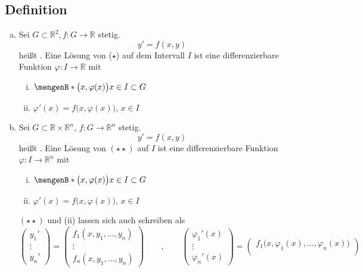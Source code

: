 \subsection[Definition: Gewöhnliche Differentialgleichungen]{Definition} %
\label{sub:11}
\begin{enumerate}[a)]
	\item Sei $G \subset \mathds{R}^2, f : G \to \mathds{R}$ stetig. 
	\[
		y' = f(x,y) \tag{$\star$}
	\] 
	heißt .  Eine Lösung von ($\star$) auf dem Intervall $I$ ist eine differenzierbare Funktion 
	$\varphi : I \to \mathds{R}$ mit
	\begin{enumerate}[(i)]
		\item $\set[\big(x, \varphi(x)\big)]{x \in I} \subset G $
		\item $\varphi ' (x) = f\big(x, \varphi(x)\big)$, $x  \in I$
	\end{enumerate}
	\item Sei $G \subset \mathds{R} \times \mathds{R}^n$, $f : G \to \mathds{R}^n$ stetig.
	\[
		y' = f(x,y) \tag{$\star \star$}
	\]
	heißt . Eine Lösung von $(\star \star)$ auf $I$ ist eine differenzierbare Funktion 
	$\varphi : I \to \mathds{R}^n$ mit
	\begin{enumerate}[(i)]
		\item $\set[\big(x, \varphi(x)\big)]{x \in I} \subset G$
		\item $\varphi'(x) = f \big(x,\varphi(x)\big)$, $x \in I$
	\end{enumerate}
	$(\star \star)$ und (ii) lassen sich auch schreiben als 
	\[
		\begin{pmatrix}
			y_1' \\ \vdots \\ y_n'
		\end{pmatrix} = \begin{pmatrix}
			f_1(x, y_1, \ldots , y_n) \\
			\vdots \\
			f_n(x, y_1, \ldots , y_n)
		\end{pmatrix} \qquad , \qquad \begin{pmatrix}
			\varphi_1'(x) \\
			\vdots \\
			\varphi_n'(x)
		\end{pmatrix} = \begin{pmatrix}
			f_1\big(x, \varphi_1(x), \ldots , \varphi_n(x)\big) \\

\end{pmatrix}\]
\end{enumerate}
